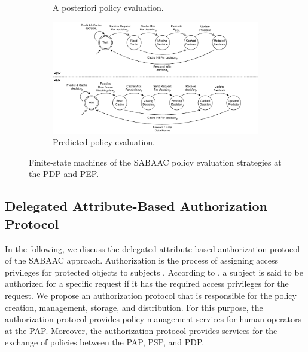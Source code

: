 \begin{figure}
\begin{subfigure}[t]{0.55\linewidth}
        \caption{A posteriori policy evaluation.}
        \label{fig:aposteriori_policy_evaluation_strategy}
        \vspace{1.0\baselineskip}
    \end{subfigure}
    \begin{subfigure}[t]{1.\linewidth}
        \centering
        \includegraphics[width=\linewidth]{figures/predicted_evaluation_strategy.drawio.pdf}
        \caption{Predicted policy evaluation.}
        \label{fig:predicted_policy_evaluation_strategy}
    \end{subfigure}
    \caption{Finite-state machines of the SABAAC policy evaluation strategies at the PDP and PEP.}
    \label{fig:policy_evaluation_strategies}
\end{figure}

\subsection{Delegated Attribute-Based Authorization Protocol}
\label{sec:approach:sabaac:authorization}
In the following, we discuss the delegated attribute-based authorization protocol of the SABAAC approach.
Authorization is the process of assigning access privileges for protected objects to subjects \cite{Eckert2023}.
According to \citeauthor{Eckert2023} \cite{Eckert2023}, a subject is said to be authorized for a specific request if it has the required access privileges for the request.
We propose an authorization protocol that is responsible for the policy creation, management, storage, and distribution.
For this purpose, the authorization protocol provides policy management services for human operators at the PAP.
Moreover, the authorization protocol provides services for the exchange of policies between the PAP, PSP, and PDP.

